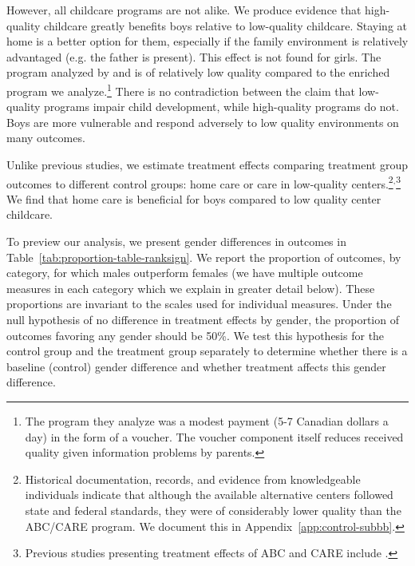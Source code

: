 However, all childcare programs are not alike. We produce evidence that high-quality childcare greatly benefits boys relative to low-quality childcare. Staying at home is a better option for them, especially if the family environment is relatively advantaged (e.g. the father is present). This effect is not found for girls. The program analyzed by \citet{Baker_Gruber_Milligan_2015_Noncog_Defects} and \citet{Kottelenberg-Lehrer_2014_Gender-Effects} is of relatively low quality compared to the enriched program we analyze.\footnote{The program they analyze was a modest payment (5-7 Canadian dollars a day) in the form of a voucher. The voucher component itself reduces received quality given information problems by parents.} There is no contradiction between the claim that low-quality programs impair child development, while high-quality programs do not. Boys are more vulnerable and respond adversely to low quality environments on many outcomes.

Unlike previous studies, we estimate treatment effects comparing treatment group outcomes to different control groups: home care or care in low-quality centers.\footnote{Historical documentation, records, and evidence from knowledgeable individuals indicate that although the available alternative centers followed state and federal standards, they were of considerably lower quality than the ABC/CARE program. We document this in Appendix~\ref{app:control-subbb}.}$^,$\footnote{Previous studies presenting treatment effects of ABC and CARE include \citet{Ramey_etal_1985_Project-CARE_TiECSE,Clarke_Campbell_1998_ABC_Comparison_ECRQ,Campbell_Pungello_etal_2001_DP,Campbell_Ramey_etal_2002_ADS,Campbell_Wasik_etal_2008_ECRQ,Campbell_Conti_etal_2014_EarlyChildhoodInvestments}.} We find that home care is beneficial for boys compared to low quality center childcare.

To preview our analysis, we present gender differences in outcomes in Table~\ref{tab:proportion-table-ranksign}. We report the proportion of outcomes, by category, for which males outperform females (we have multiple outcome measures in each category which we explain in greater detail below). These proportions are invariant to the scales used for individual measures. Under the null hypothesis of no difference in treatment effects by gender, the proportion of outcomes favoring any gender should be 50\%. We test this hypothesis for the control group and the treatment group separately to determine whether there is a baseline (control) gender difference and whether treatment affects this gender difference.


